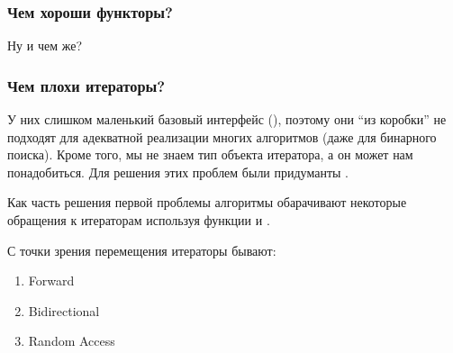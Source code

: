 \subsubsection{Чем хороши функторы?}
Ну и чем же? %

\subsubsection{Чем плохи итераторы?}
У них слишком маленький базовый интерфейс (\cc{++, --, *, ->}), поэтому они ``из коробки'' не подходят для адекватной реализации многих алгоритмов (даже для бинарного поиска). Кроме того, мы не знаем тип объекта итератора, а он может нам понадобиться.
Для решения этих проблем были придуманты .

Как часть решения первой проблемы алгоритмы обарачивают некоторые обращения к итераторам используя функции  и .

С точки зрения перемещения итераторы бывают:
\begin{enumerate}
    \item Forward
    \item Bidirectional
    \item Random Access
\end{enumerate}
